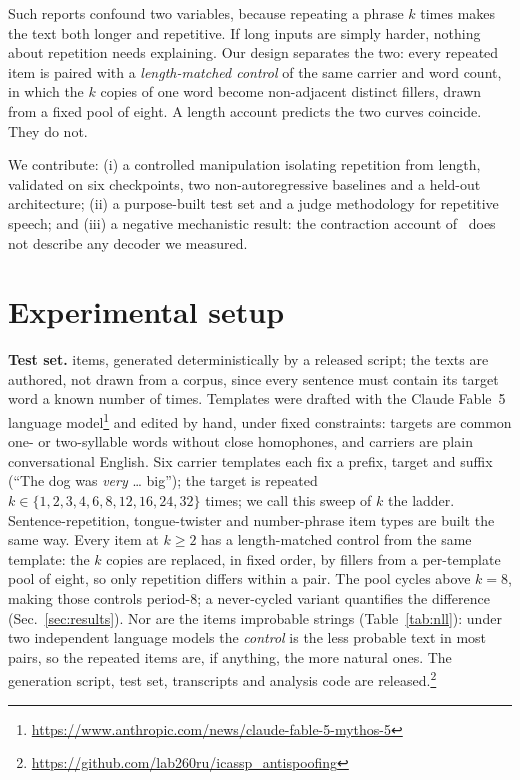 \documentclass{article}
\begin{document}
Such reports confound two variables, because repeating a phrase $k$ times
makes the text both longer and repetitive. If long inputs are simply harder, nothing about repetition needs
explaining. Our design separates the two:
every repeated item is paired with a \emph{length-matched control} of the
same carrier and word count, in which the $k$ copies of one
word become non-adjacent distinct fillers, drawn from a fixed pool of
eight. A length account predicts the two curves
coincide. They do not.

We contribute: (i) a controlled manipulation isolating repetition
from length, validated on six checkpoints, two non-autoregressive
baselines and a held-out architecture; (ii) a purpose-built test set and a judge methodology for repetitive
speech; and (iii) a negative mechanistic result: the contraction
account of~\cite{viakhirev2026dispersion} does not describe any decoder
we measured.

\section{Experimental setup}
\label{sec:method}

\textbf{Test set.}
\NStimuli{} items, generated deterministically by a released script; the
texts are authored, not drawn from a corpus, since every sentence must
contain its target word a known number of times. Templates were drafted with the Claude Fable~5 language
model\footnote{\url{https://www.anthropic.com/news/claude-fable-5-mythos-5}}
and edited by hand,
under fixed constraints: targets are common one- or two-syllable words
without close homophones, and carriers are plain conversational
English. Six carrier templates each fix a prefix, target and
suffix (``The dog was \emph{very} \dots{} big''); the target is repeated
$k \in \{1,2,3,4,6,8,12,16,24,32\}$ times; we call this sweep of $k$
the ladder. Sentence-repetition, tongue-twister and number-phrase item
types are built the same way. Every item at
$k\ge2$ has a length-matched control from the same template: the $k$
copies are replaced, in fixed order, by fillers from a per-template pool
of eight, so only repetition differs within a pair. The pool cycles above $k{=}8$, making those
controls period-8; a never-cycled variant quantifies the difference
(Sec.~\ref{sec:results}). Nor are the items improbable
strings (Table~\ref{tab:nll}): under two independent language models the
\emph{control} is the less probable text in most pairs, so the repeated
items are, if anything, the more natural ones. The generation script, test set, transcripts and analysis code are released.\footnote{\url{https://github.com/lab260ru/icassp_antispoofing}}
\end{document}

